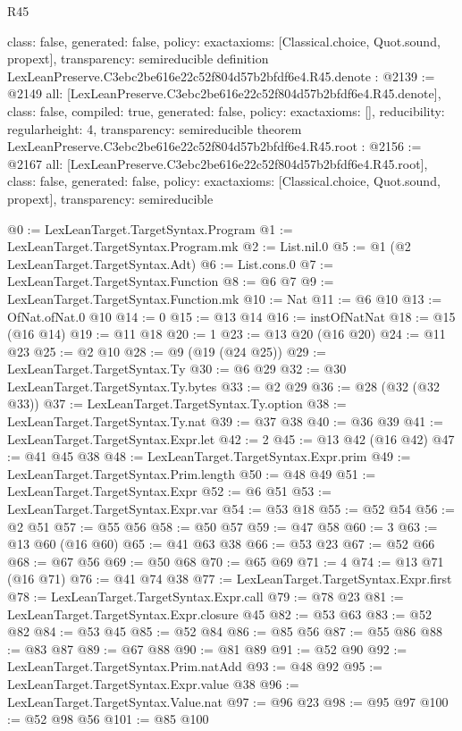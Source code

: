 \begin{lexlean}{R45}
\begin{coremodule}
{  class: false,
  generated: false,
  policy: exact{axioms: [Classical.choice, Quot.sound, propext]},
  transparency: semireducible
}
definition LexLeanPreserve.C3ebc2be616e22c52f804d57b2bfdf6e4.R45.denote : @2139 := @2149 {
  all: [LexLeanPreserve.C3ebc2be616e22c52f804d57b2bfdf6e4.R45.denote],
  class: false,
  compiled: true,
  generated: false,
  policy: exact{axioms: []},
  reducibility: regular{height: 4},
  transparency: semireducible
}
theorem LexLeanPreserve.C3ebc2be616e22c52f804d57b2bfdf6e4.R45.root : @2156 := @2167 {
  all: [LexLeanPreserve.C3ebc2be616e22c52f804d57b2bfdf6e4.R45.root],
  class: false,
  generated: false,
  policy: exact{axioms: [Classical.choice, Quot.sound, propext]},
  transparency: semireducible
}

@0 := LexLeanTarget.TargetSyntax.Program
@1 := LexLeanTarget.TargetSyntax.Program.mk
@2 := List.nil.{0}
@5 := @1 (@2 LexLeanTarget.TargetSyntax.Adt)
@6 := List.cons.{0}
@7 := LexLeanTarget.TargetSyntax.Function
@8 := @6 @7
@9 := LexLeanTarget.TargetSyntax.Function.mk
@10 := Nat
@11 := @6 @10
@13 := OfNat.ofNat.{0} @10
@14 := 0
@15 := @13 @14
@16 := instOfNatNat
@18 := @15 (@16 @14)
@19 := @11 @18
@20 := 1
@23 := @13 @20 (@16 @20)
@24 := @11 @23
@25 := @2 @10
@28 := @9 (@19 (@24 @25))
@29 := LexLeanTarget.TargetSyntax.Ty
@30 := @6 @29
@32 := @30 LexLeanTarget.TargetSyntax.Ty.bytes
@33 := @2 @29
@36 := @28 (@32 (@32 @33))
@37 := LexLeanTarget.TargetSyntax.Ty.option
@38 := LexLeanTarget.TargetSyntax.Ty.nat
@39 := @37 @38
@40 := @36 @39
@41 := LexLeanTarget.TargetSyntax.Expr.let
@42 := 2
@45 := @13 @42 (@16 @42)
@47 := @41 @45 @38
@48 := LexLeanTarget.TargetSyntax.Expr.prim
@49 := LexLeanTarget.TargetSyntax.Prim.length
@50 := @48 @49
@51 := LexLeanTarget.TargetSyntax.Expr
@52 := @6 @51
@53 := LexLeanTarget.TargetSyntax.Expr.var
@54 := @53 @18
@55 := @52 @54
@56 := @2 @51
@57 := @55 @56
@58 := @50 @57
@59 := @47 @58
@60 := 3
@63 := @13 @60 (@16 @60)
@65 := @41 @63 @38
@66 := @53 @23
@67 := @52 @66
@68 := @67 @56
@69 := @50 @68
@70 := @65 @69
@71 := 4
@74 := @13 @71 (@16 @71)
@76 := @41 @74 @38
@77 := LexLeanTarget.TargetSyntax.Expr.first
@78 := LexLeanTarget.TargetSyntax.Expr.call
@79 := @78 @23
@81 := LexLeanTarget.TargetSyntax.Expr.closure @45
@82 := @53 @63
@83 := @52 @82
@84 := @53 @45
@85 := @52 @84
@86 := @85 @56
@87 := @55 @86
@88 := @83 @87
@89 := @67 @88
@90 := @81 @89
@91 := @52 @90
@92 := LexLeanTarget.TargetSyntax.Prim.natAdd
@93 := @48 @92
@95 := LexLeanTarget.TargetSyntax.Expr.value @38
@96 := LexLeanTarget.TargetSyntax.Value.nat
@97 := @96 @23
@98 := @95 @97
@100 := @52 @98 @56
@101 := @85 @100

\end{coremodule}
\end{lexlean}
